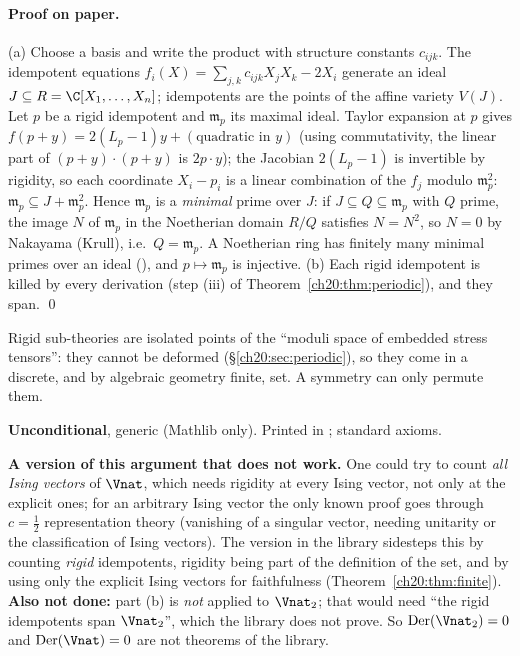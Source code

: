 \paragraph{Proof on paper.}  (a) Choose a basis and write the product with structure constants $c_{ijk}$.  The
idempotent equations $f_i(X)=\sum_{j,k}c_{ijk}X_jX_k-2X_i$ generate an ideal $J\subseteq R=\C[X_1,\dots,X_n]$; idempotents
are the points of the affine variety $V(J)$.  Let $p$ be a rigid idempotent and $\mathfrak m_p$ its maximal ideal.  Taylor
expansion at $p$ gives $f(p+y)=2(L_p-1)y+(\text{quadratic in }y)$ (using commutativity, the linear part of
$(p+y)\cdot(p+y)$ is $2p\cdot y$); the Jacobian $2(L_p-1)$ is invertible by rigidity, so each coordinate $X_i-p_i$ is a linear
combination of the $f_j$ modulo $\mathfrak m_p^2$: $\mathfrak m_p\subseteq J+\mathfrak m_p^2$.  Hence $\mathfrak m_p$ is a
\emph{minimal} prime over $J$: if $J\subseteq Q\subseteq\mathfrak m_p$ with $Q$ prime, the image $N$ of $\mathfrak m_p$ in the
Noetherian domain $R/Q$ satisfies $N=N^2$, so $N=0$ by Nakayama (Krull), i.e.\ $Q=\mathfrak m_p$.  A Noetherian ring has
finitely many minimal primes over an ideal (), and $p\mapsto\mathfrak m_p$
is injective.  (b) Each rigid idempotent is killed by every derivation (step (iii) of Theorem~\ref{ch20:thm:periodic}), and
they span. \qed
\begin{physics}
Rigid sub-theories are isolated points of the ``moduli space of embedded stress tensors'': they cannot be deformed
(\S\ref{ch20:sec:periodic}), so they come in a discrete, and by algebraic geometry finite, set.  A symmetry can only permute
them.
\end{physics}
\begin{status}
\textbf{Unconditional}, generic (Mathlib only).  Printed in ;
standard axioms.
\end{status}

\begin{warning}
\textbf{A version of this argument that does not work.}  One could try to
count
\emph{all Ising vectors} of $\Vnat$, which needs rigidity at every Ising vector, not only at the explicit ones; for an
arbitrary Ising vector the only known proof goes through $c=\tfrac12$ representation theory (vanishing of a singular vector,
needing unitarity or the classification of Ising vectors).  The version in the library sidesteps this by counting
\emph{rigid} idempotents, rigidity being part of the definition of the set, and by using only the explicit Ising vectors
for faithfulness (Theorem~\ref{ch20:thm:finite}).  \textbf{Also not done:} part (b) is \emph{not} applied to $\Vnat_2$; that
would need ``the rigid idempotents span $\Vnat_2$'', which the library does not prove.  So $\mathrm{Der}(\Vnat_2)=0$ and
$\mathrm{Der}(\Vnat)=0$ are not theorems of the library.
\end{warning}

